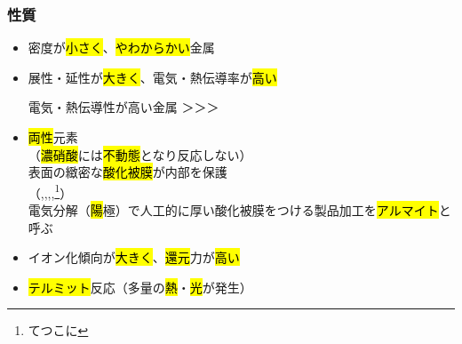 \subsubsection{性質}
\begin{itemize}
  \item 密度が\hl{小さく}、\hl{やわからかい}金属
  \item 展性・延性が\hl{大きく}、電気・熱伝導率が\hl{高い}
        \begin{itembox}[l]{電気・熱伝導性が高い金属}
          \hl{}＞\hl{}＞\hl{}＞\hl{}
        \end{itembox}
  \item \hl{両性}元素\\
        （\hl{濃硝酸}には\hl{不動態}となり反応しない）\\
        表面の緻密な\hl{酸化被膜}が内部を保護\\
        （\hl{},\hl{},\hl{},\hl{},\hl{}\footnote{てつこに}）\\
        電気分解（\hl{陽}極）で人工的に厚い酸化被膜をつける製品加工を\hl{アルマイト}と呼ぶ
  \item イオン化傾向が\hl{大きく}、\hl{還元}力が\hl{高い}
  \item \hl{テルミット}反応（多量の\hl{熱}・\hl{光}が発生）
\end{itemize}
